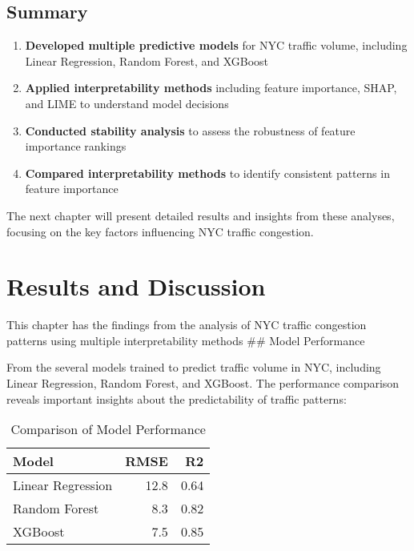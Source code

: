\documentclass[
  letterpaper,
  DIV=11,
  numbers=noendperiod]{scrreprt}
\providecommand{\tightlist}{%
  \setlength{\itemsep}{0pt}\setlength{\parskip}{0pt}}\usepackage{longtable,booktabs,array}
\begin{document}
\section{Summary}\label{summary-1}

\begin{enumerate}
\def\labelenumi{\arabic{enumi}.}
\tightlist
\item
  \textbf{Developed multiple predictive models} for NYC traffic volume,
  including Linear Regression, Random Forest, and XGBoost
\item
  \textbf{Applied interpretability methods} including feature
  importance, SHAP, and LIME to understand model decisions
\item
  \textbf{Conducted stability analysis} to assess the robustness of
  feature importance rankings
\item
  \textbf{Compared interpretability methods} to identify consistent
  patterns in feature importance
\end{enumerate}

The next chapter will present detailed results and insights from these
analyses, focusing on the key factors influencing NYC traffic
congestion.


\chapter{Results and Discussion}\label{results-and-discussion}

This chapter has the findings from the analysis of NYC traffic
congestion patterns using multiple interpretability methods \#\# Model
Performance

From the several models trained to predict traffic volume in NYC,
including Linear Regression, Random Forest, and XGBoost. The performance
comparison reveals important insights about the predictability of
traffic patterns:

\begin{longtable}[t]{lrr}
\caption{\label{tab:load-results}Comparison of Model Performance}\\
\toprule
Model & RMSE & R2\\
\midrule
Linear Regression & 12.8 & 0.64\\
Random Forest & 8.3 & 0.82\\
XGBoost & 7.5 & 0.85\\
\bottomrule
\end{longtable}
\end{document}
